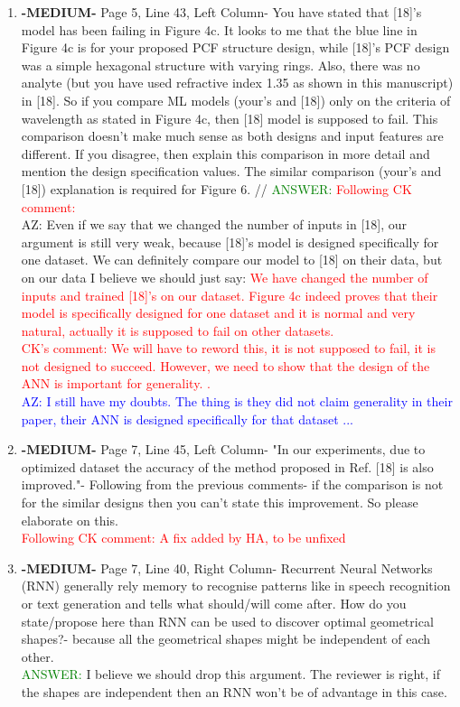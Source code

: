 \documentclass{article}
\begin{document}
\begin{enumerate}
 \item \textbf{-MEDIUM-} Page 5, Line 43, Left Column- You have stated that [18]'s model has been failing in Figure 4c. It looks to me that the blue line in Figure 4c is for your proposed PCF structure design, while [18]'s PCF design was a simple hexagonal structure with varying rings. Also, there was no analyte (but you have used refractive index 1.35 as shown in this manuscript) in [18]. So if you compare ML models (your's and [18]) only on the criteria of wavelength as stated in Figure 4c, then [18] model is supposed to fail. This comparison doesn't make much sense as both designs and input features are different. If you disagree, then explain this comparison in more detail and mention the design specification values.
The similar comparison (your's and [18]) explanation is required for Figure 6. //
\textcolor{green}{ANSWER:} \textcolor{red}{Following CK comment: } \\ AZ: Even if we say that we changed the number of inputs in [18], our argument is still very weak, because [18]'s model is designed specifically for one dataset. We can definitely compare our model to [18] on their data, but on our data I believe we should just say: \textcolor{red} {We have changed the number of inputs and trained [18]'s on our dataset. Figure 4c indeed proves that their model is specifically designed for one dataset and it is normal and very natural, actually it is supposed to fail on other datasets.} \\ \textcolor{red}{CK's comment: We will have to reword this, it is not supposed to fail, it is not designed to succeed. However, we need to show that the design of the ANN is important for generality. .} \\ \textcolor{blue}{AZ: I still have my doubts. The thing is they did not claim generality in their paper, their ANN is designed specifically for that dataset ...}

\item \textbf{-MEDIUM-} Page 7, Line 45, Left Column- "In our experiments, due to optimized dataset the accuracy of the method proposed in Ref. [18] is also improved."- Following from the previous comments- if the comparison is not for the similar designs then you can't state this improvement. So please elaborate on this. \\
\textcolor{red}{Following CK comment: A fix added by HA, to be unfixed}

\item \textbf{-MEDIUM-} Page 7, Line 40, Right Column- Recurrent Neural Networks (RNN) generally rely memory to recognise patterns like in speech recognition or text generation and tells what should/will come after. How do you state/propose here than RNN can be used to discover optimal geometrical shapes?- because all the geometrical shapes might be independent of each other. \\
\textcolor{green}{ANSWER: } I believe we should drop this argument. The reviewer is right, if the shapes are independent then an RNN won't be of advantage in this case. \\


\end{enumerate}
\end{document}
